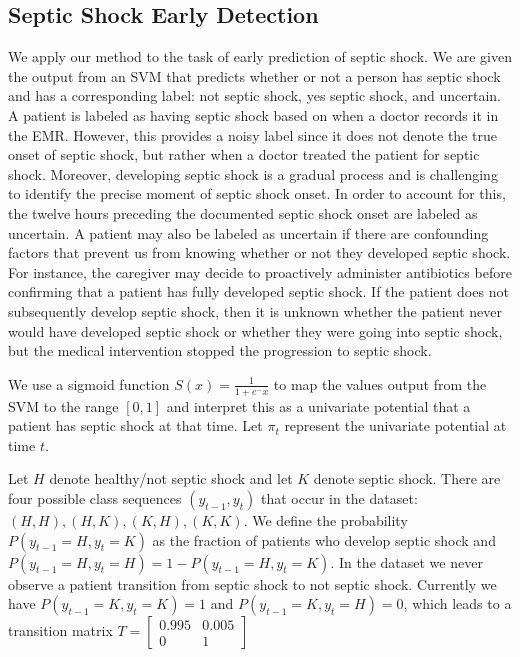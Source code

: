 \documentclass[12pt,solutions]{article}
\begin{document}
\subsection{Septic Shock Early Detection}

We apply our method to the task of early prediction of septic shock. We are given the output from an SVM that predicts whether or not a person has septic shock and has a corresponding label: not septic shock, yes septic shock, and uncertain. A patient is labeled as having septic shock based on when a doctor records it in the EMR. However, this provides a noisy label since it does not denote the true onset of septic shock, but rather when a doctor treated the patient for septic shock. Moreover, developing septic shock is a gradual process and is challenging to identify the precise moment of septic shock onset. In order to account for this, the twelve hours preceding the documented septic shock onset are labeled as uncertain. A patient may also be labeled as uncertain if there are confounding factors that prevent us from knowing whether or not they developed septic shock. For instance, the caregiver may decide to proactively administer antibiotics before confirming that a patient has fully developed septic shock. If the patient does not subsequently develop septic shock, then it is unknown whether the patient never would have developed septic shock or whether they were going into septic shock, but the medical intervention stopped the progression to septic shock. 

We use a sigmoid function $S(x) = \frac{1}{1+e^-x}$ to map the values output from the SVM to the range $[0,1]$ and interpret this as a univariate potential that a patient has septic shock at that time. Let $\pi_t$ represent the univariate potential at time $t$.

Let $H$ denote healthy/not septic shock and let $K$ denote septic shock. There are four possible class sequences $(y_{t-1},y_t)$ that occur in the dataset: $(H,H), (H,K), (K,H), (K,K)$. We define the probability $P(y_{t-1}=H, y_t=K)$ as the fraction of patients who develop septic shock and $P(y_{t-1}=H, y_t=H) = 1 - P(y_{t-1}=H, y_t=K)$. In the dataset we never observe a patient transition from septic shock to not septic shock. Currently we have $P(y_{t-1}=K, y_t=K) = 1$ and  $P(y_{t-1}=K, y_t=H) = 0$, which leads to a transition matrix $T = \begin{bmatrix}0.995&0.005\\0&1\end{bmatrix}$
\end{document}
